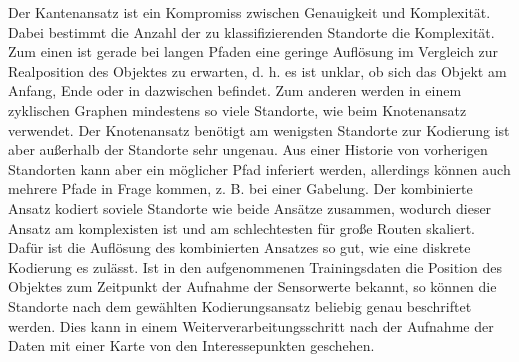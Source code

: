 Der Kantenansatz ist ein Kompromiss zwischen Genauigkeit und Komplexität.
Dabei bestimmt die Anzahl der zu klassifizierenden Standorte die Komplexität.
Zum einen ist gerade bei langen Pfaden eine geringe Auflösung im Vergleich zur Realposition des Objektes zu erwarten,
d. h. es ist unklar, ob sich das Objekt am Anfang, Ende oder in dazwischen befindet.
Zum anderen werden in einem zyklischen Graphen mindestens so viele Standorte, wie beim Knotenansatz verwendet.
Der Knotenansatz benötigt am wenigsten Standorte zur Kodierung ist aber außerhalb der Standorte sehr ungenau.
Aus einer Historie von vorherigen Standorten kann aber ein möglicher Pfad inferiert werden,
allerdings können auch mehrere Pfade in Frage kommen, z. B. bei einer Gabelung.
Der kombinierte Ansatz kodiert soviele Standorte wie beide Ansätze zusammen,
wodurch dieser Ansatz am komplexisten ist und am schlechtesten für große Routen skaliert.
Dafür ist die Auflösung des kombinierten Ansatzes so gut, wie eine diskrete Kodierung es zulässt.
\newline
\newline
Ist in den aufgenommenen Trainingsdaten die Position des Objektes zum Zeitpunkt der Aufnahme der Sensorwerte bekannt,
so können die Standorte nach dem gewählten Kodierungsansatz beliebig genau beschriftet werden.
Dies kann in einem Weiterverarbeitungsschritt nach der Aufnahme der Daten mit einer Karte von den Interessepunkten geschehen.